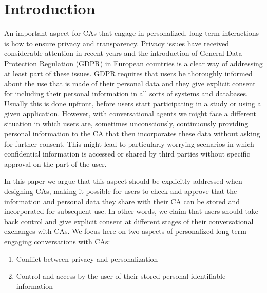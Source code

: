 \documentclass[sigchi-a,nonacm]{acmart}
\begin{document}
\section{Introduction} 

An important aspect for CAs that engage in personalized, long-term interactions is how to ensure privacy and transparency. Privacy issues have received considerable attention in recent years and the introduction of General Data Protection Regulation (GDPR) in European countries is a clear way of addressing at least part of these issues. GDPR requires that users be thoroughly informed about the use that is made of their personal data and they give explicit consent for including their personal information in all sorts of systems and databases. Usually this is done upfront, before users start participating in a study or using a given application. However, with conversational agents we might face a different situation in which users are, sometimes unconsciously, continuously providing personal information to the CA that then incorporates these data without asking for further consent. This might lead to particularly worrying scenarios in which confidential information is accessed or shared by third parties without specific approval on the part of the user. 

In this paper we argue that this aspect should be explicitly addressed when designing CAs, making it possible for users to check and approve that the information and personal data they share with their CA can be stored and incorporated for subsequent use. In other words, we claim that users should take back control and give explicit consent at different stages of their conversational exchanges with CAs. 
We focus here on two aspects of personalized long term engaging conversations with CAs:
\begin{enumerate}
\item Conflict between privacy and personalization 
\item Control and access by the user of their stored personal identifiable information
\end{enumerate}
\end{document}
